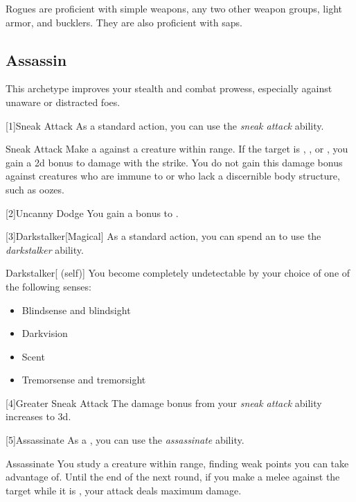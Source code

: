         Rogues are proficient with simple weapons, any two other weapon groups, light armor, and bucklers.
        They are also proficient with saps.

    \subsection{Assassin}
        This archetype improves your stealth and combat prowess, especially against unaware or distracted foes.

        [1]{Sneak Attack} As a standard action, you can use the \textit{sneak attack} ability.
        \begin{ability}{Sneak Attack}
            Make a  against a creature within \rngclose range.
            If the target is \unaware, , or , you gain a \plus2d bonus to damage with the strike.
            You do not gain this damage bonus against creatures who are immune to  or who lack a discernible body structure, such as oozes.
        \end{ability}

        [2]{Uncanny Dodge} You gain a  bonus to .

        [3]{Darkstalker}[Magical] As a standard action, you can spend an  to use the \textit{darkstalker} ability.
        \begin{ability}{Darkstalker}[ (self)]
            You become completely undetectable by your choice of one of the following senses:
            \begin{itemize}
                \item Blindsense and blindsight
                \item Darkvision
                \item Scent
                \item Tremorsense and tremorsight
            \end{itemize}
        \end{ability}

        [4]{Greater Sneak Attack}
        The damage bonus from your \textit{sneak attack} ability increases to \plus3d.

        [5]{Assassinate} As a , you can use the \textit{assassinate} ability.
        \begin{ability}{Assassinate}
            You study a creature within \rnglong range, finding weak points you can take advantage of.
            Until the end of the next round, if you make a melee  against the target while it is \unaware, your attack deals maximum damage.
        \end{ability}

